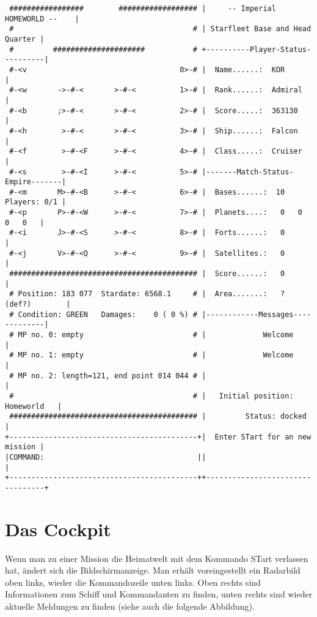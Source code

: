 \footnotesize
\hspace{-1.0cm}
\begin{verbatim}
 #################        ################## |     -- Imperial HOMEWORLD --    |
 #                                         # | Starfleet Base and Head Quarter |
 #         #####################           # +----------Player-Status----------|
 #-<v                                   0>-# |  Name......:  KOR               |
 #-<w       ->-#-<       >-#-<          1>-# |  Rank......:  Admiral           |
 #-<b       ;>-#-<       >-#-<          2>-# |  Score.....:  363130            |
 #-<h        >-#-<       >-#-<          3>-# |  Ship......:  Falcon            |
 #-<f        >-#-<F      >-#-<          4>-# |  Class.....:  Cruiser           |
 #-<s        >-#-<I      >-#-<          5>-# |-------Match-Status-Empire-------|
 #-<m       M>-#-<B      >-#-<          6>-# |  Bases......:  10  Players: 0/1 |
 #-<p       P>-#-<W      >-#-<          7>-# |  Planets....:   0   0   0   0   |
 #-<i       J>-#-<S      >-#-<          8>-# |  Forts......:   0               |
 #-<j       V>-#-<Q      >-#-<          9>-# |  Satellites.:   0               |
 ########################################### |  Score......:   0               |
 # Position: 183 077  Stardate: 6568.1     # |  Area.......:   ? (def?)        |
 # Condition: GREEN   Damages:    0 ( 0 %) # |------------Messages-------------|
 # MP no. 0: empty                         # |             Welcome             |
 # MP no. 1: empty                         # |             Welcome             |
 # MP no. 2: length=121, end point 014 044 # |                                 |
 #                                         # |   Initial position: Homeworld   |
 ########################################### |         Status: docked          |
+-------------------------------------------+|  Enter STart for an new mission |
|COMMAND:                                   ||                                 |
+-------------------------------------------++---------------------------------+
\end{verbatim}

\normalsize

\newpage

\section{Das Cockpit}

Wenn man zu einer Mission die Heimatwelt mit dem Kommando STart verlassen
hat, \"andert sich die Bildschirmanzeige. Man erh\"alt voreingestellt ein
Radarbild oben links, wieder die Kommandozeile unten links. Oben rechts
sind Informationen zum Schiff und Kommandanten zu finden, unten rechts
sind wieder aktuelle Meldungen zu finden (siehe auch die folgende Abbildung).

